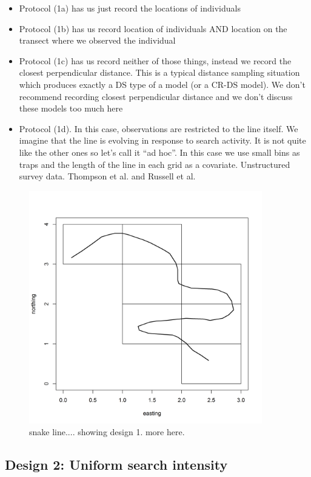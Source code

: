 \begin{itemize}
 \item[] Protocol (1a) has us just record the locations of individuals
 \item[] Protocol (1b) has us record location of individuals AND
   location on the transect where we observed the individual
 \item[] Protocol (1c) has us record neither of those things, instead
   we record the closest perpendicular distance. This is a typical
   distance sampling situation which produces exactly a DS type of a
   model (or a CR-DS model). We don't recommend recording closest
   perpendicular distance and we don't discuss these models too much
   here
 \item[] Protocol (1d). In this case, observations are restricted to
   the line itself. We imagine that the line is evolving in response
   to search activity. It is not quite like the other ones so let's
   call it ``ad hoc''. In this case we use small bins as traps and the
   length of the line in each grid as a covariate. Unstructured survey
   data. Thompson et al. and Russell et al.
 \end{itemize}


\begin{figure}
\centering
\includegraphics[width=4in,height=4in]{Ch15-searchencounter/figs/snakeline.png}
\caption{snake line.... showing design 1. more here.
}
\label{searchencounter.fig.snakeline}
\label{fig.snakeline}
\end{figure}



\subsection{Design 2: Uniform search intensity} 

